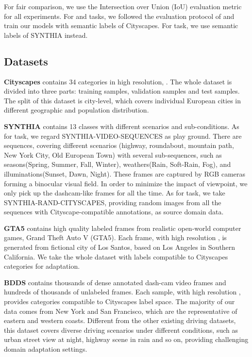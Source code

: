 \documentclass[10pt,twocolumn,letterpaper]{article}
\begin{document}
For fair comparison, we use the Intersection over Union (IoU) evaluation metric for all experiments. For  and  tasks, we followed the evaluation protocol of \cite{cordts2016cityscapes} and train our models with  semantic labels of Cityscapes. For  task, we use  semantic labels of SYNTHIA instead. 

\subsection{Datasets}

\textbf{Cityscapes} contains 34 categories in high resolution, . The whole dataset is divided into three parts:  training samples,  validation samples and  test samples. The split of this dataset is city-level, which covers individual European cities in different geographic and population distribution. 



\textbf{SYNTHIA} contains 13 classes with different scenarios and sub-conditions. As for  task, we regard SYNTHIA-VIDEO-SEQUENCES as play ground. There are  sequences, covering different scenarios (highway, roundabout, mountain path, New York City, Old European Town) with several sub-sequences, such as seasons(Spring, Summer, Fall, Winter), weathers(Rain, Soft-Rain, Fog), and illuminations(Sunset, Dawn, Night). These frames are captured by  RGB cameras forming a binocular  visual field. In order to minimize the impact of viewpoint, we only pick up the dashcam-like frames for all the time.  As for  task, we take SYNTHIA-RAND-CITYSCAPES, providing  random images from all the sequences with Cityscape-compatible annotations, as source domain data. 

\textbf{GTA5} contains  high quality labeled frames from realistic open-world computer games, Grand Theft Auto V (GTA5). Each frame, with high resolution , is generated from fictional city of Los Santos, based on Los Angeles in Southern California. We take the whole dataset with labels compatible to Cityscapes categories for  adaptation.

\textbf{BDDS} contains thousands of dense annotated dash-cam video frames and hundreds of thousands of unlabeled frames. Each sample, with high resolution , provides  categories compatible to Cityscapes label space. The majority of our data comes from New York and San Francisco, which are the representative of eastern and western coasts. Different from the other existing driving datasets, this dataset covers diverse driving scenarios under different conditions, such as urban street view at night, highway scene in rain and so on, providing challenging domain adaptation settings. 
\end{document}
